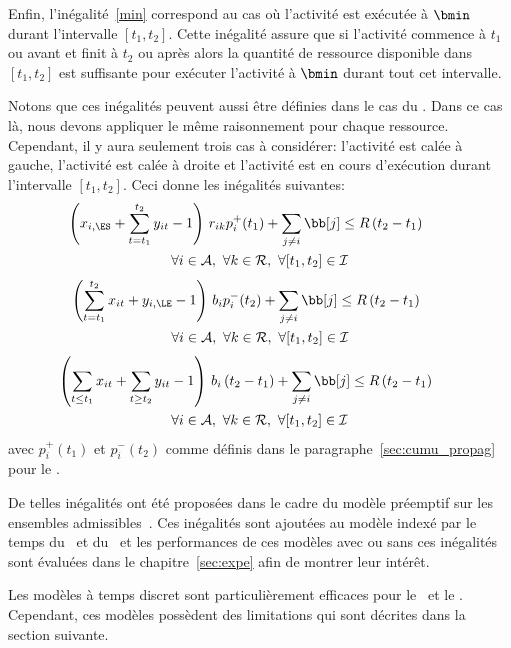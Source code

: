 Enfin, l'inégalité~\eqref{min} correspond au cas où l'activité est
exécutée à $\bmin$ durant l'intervalle $[t_1,t_2]$. Cette inégalité
assure que si l'activité commence à $t_1$ ou avant et finit à $t_2$ ou
après alors la quantité de ressource disponible dans $[t_1,t_2]$ est
suffisante pour exécuter l'activité à $\bmin$ durant tout cet
intervalle.


Notons que ces inégalités peuvent aussi être définies dans le cas du
\RCPSP. Dans ce cas là, nous devons appliquer le même raisonnement
pour chaque ressource. Cependant, il y aura seulement trois cas à
considérer: l'activité est calée à gauche, l'activité est calée à
droite et l'activité est en cours d'exécution durant l'intervalle
$[t_1,t_2]$. Ceci donne les inégalités suivantes:
\begin{multline} \left(x_{i,\ES} + \sum_{t=t_1}^{t_2}y_{it} -1\right)
\, r_{ik}p_i^+(t_1)+ \sum_{j\neq i} \bb[j] \le R\left(t_2-t_1\right)
\qquad \\ \forall i \in {\cal A},\ \forall k \in \R ,\ \forall
[t_1,t_2] \in \I
    \label{RCPSP_left}
\end{multline} \vspace{-1.3cm}
\begin{multline} \left(\sum_{t=t_1}^{t_2}x_{it} + y_{i,\LE}-1\right)
\, b_ip_i^-(t_2) + \sum_{j\neq i} \bb[j] \le R\left(t_2-t_1\right)
\qquad \\ \forall i \in {\cal A},\ \forall k \in \R ,\ \forall
[t_1,t_2] \in \I
    \label{RCPSP_right}
\end{multline} \vspace{-1.3cm}
\begin{multline} \left(\sum_{t\le t_1}x_{it} + \sum_{t\ge t_2}y_{it}
-1 \right) \, b_i\left(t_2-t_1\right) + \sum_{j\neq i} \bb[j] \le
R\left(t_2-t_1\right) \qquad \\ \forall i \in {\cal A},\ \forall k \in
\R ,\ \forall [t_1,t_2] \in \I
    \label{RCPSP_min}
\end{multline}
avec $p_i^+(t_1)$ et $p_i^-(t_2)$ comme définis dans le
paragraphe~\ref{sec:cumu_propag} pour le \CUSP. 

De telles inégalités ont été proposées dans le cadre du modèle
préemptif sur les ensembles admissibles~\cite{BD}. Ces inégalités sont
ajoutées au modèle indexé par le temps du \CECSP~et du \RCPSP~et les
performances de ces modèles avec ou sans ces inégalités sont évaluées
dans le chapitre~\ref{sec:expe} afin de montrer leur intérêt.
 
Les modèles à temps discret sont particulièrement efficaces pour le
\RCPSP~et le \CECSP. Cependant, ces modèles possèdent des limitations
qui sont décrites dans la section suivante. 



